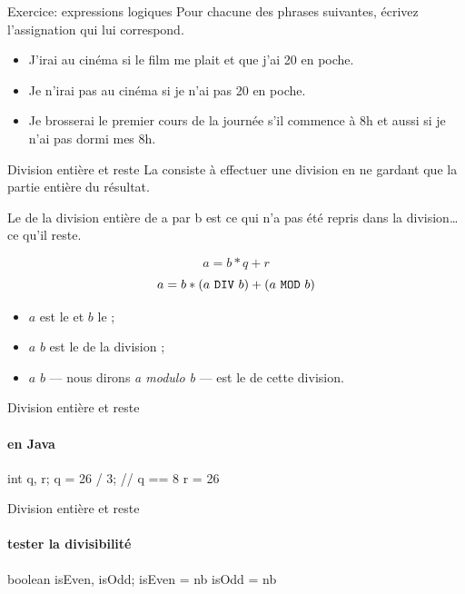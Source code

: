 \begin{hideedit}
\begin{frame}{Exercice: expressions logiques}
  Pour chacune des phrases suivantes,
  écrivez l’assignation qui lui correspond.
  \begin{itemize}[<+->]
    \item J’irai au cinéma si le film me plait et que
      j’ai 20\texteuro{} en poche.
    \item Je n’irai pas au cinéma si je n’ai pas
      20\texteuro{} en poche.
    \item Je brosserai le premier cours de la journée
      s’il commence à 8h et aussi si je n’ai pas dormi mes 8h.
  \end{itemize}
\end{frame}

\begin{frame}[fragile]{Division entière et reste}
  La  consiste à effectuer une division
  en ne gardant que la partie entière du résultat.

  Le  de la division entière de a par b
  est ce qui n’a pas été repris dans la division\dots ce qu'il reste.

  \[ a = b * q + r\]
  \[ a = b * (a ~\texttt{DIV}~ b) + (a ~\texttt{MOD}~ b)\]

  \begin{itemize}
    \item \(a\) est le  et \(b\) le ;
    \item $a$  $b$ est le  de la division ;
    \item $a$  $b$ --- nous dirons \textit{a modulo b} ---
      est le  de cette division.
  \end{itemize}
\end{frame}

\begin{frame}[fragile]{Division entière et reste}
  \framesubtitle{en Java}
  \begin{java}
int q, r;
q = 26 / 3;  // q == 8
r = 26 %
  \end{java}
\end{frame}

\begin{frame}[fragile]{Division entière et reste}
\framesubtitle{tester la divisibilité}
  \begin{java}
boolean isEven, isOdd;
isEven = nb %
isOdd = nb %
  \end{java}
\end{frame}


\end{hideedit}
